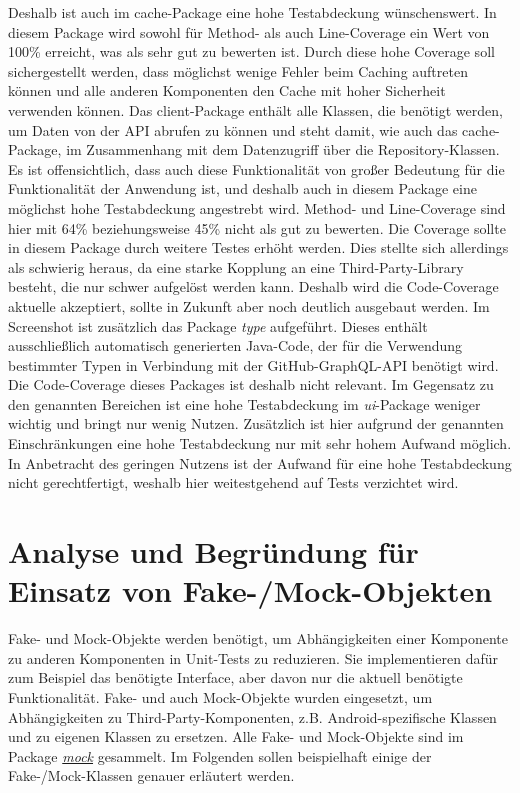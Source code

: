 Deshalb ist  auch im cache-Package eine hohe Testabdeckung wünschenswert.
In diesem Package wird sowohl für Method- als auch Line-Coverage ein Wert von 100\% erreicht, was als sehr gut zu bewerten ist.
Durch diese hohe Coverage soll sichergestellt werden, dass möglichst wenige Fehler beim Caching auftreten können und alle anderen Komponenten den Cache mit hoher Sicherheit verwenden können.
\newline
\newline
Das client-Package enthält alle Klassen, die benötigt werden, um Daten von der API abrufen zu können und steht damit, wie auch das cache-Package, im Zusammenhang mit dem Datenzugriff über die Repository-Klassen.
Es ist offensichtlich, dass auch diese Funktionalität von großer Bedeutung für die Funktionalität der Anwendung ist, und deshalb auch in diesem Package eine möglichst hohe Testabdeckung angestrebt wird.
Method- und Line-Coverage sind hier mit 64\% beziehungsweise 45\% nicht als gut zu bewerten.
Die Coverage sollte in diesem Package durch weitere Testes erhöht werden.
Dies stellte sich allerdings als schwierig heraus, da eine starke Kopplung an eine Third-Party-Library besteht, die nur schwer aufgelöst werden kann.
Deshalb wird die Code-Coverage aktuelle akzeptiert, sollte in Zukunft aber noch deutlich ausgebaut werden.
\newline
\newline
Im Screenshot ist zusätzlich das Package \textit{type} aufgeführt.
Dieses enthält ausschließlich automatisch generierten Java-Code, der für die Verwendung bestimmter Typen in Verbindung mit der GitHub-GraphQL-API benötigt wird.
Die Code-Coverage dieses Packages ist deshalb nicht relevant.
\newline
\newline
Im Gegensatz zu den genannten Bereichen ist eine hohe Testabdeckung im \textit{ui}-Package weniger wichtig und bringt nur wenig Nutzen. 
Zusätzlich ist hier aufgrund der genannten Einschränkungen eine hohe Testabdeckung nur mit sehr hohem Aufwand möglich.
In Anbetracht des geringen Nutzens ist der Aufwand für eine hohe Testabdeckung nicht gerechtfertigt, weshalb hier weitestgehend auf Tests verzichtet wird.

\newpage
\section{Analyse und Begründung für Einsatz von Fake-/Mock-Objekten}

Fake- und Mock-Objekte werden benötigt, um Abhängigkeiten einer Komponente zu anderen Komponenten in Unit-Tests zu reduzieren.
Sie implementieren dafür zum Beispiel das benötigte Interface, aber davon nur die aktuell benötigte Funktionalität.
Fake- und auch Mock-Objekte wurden eingesetzt, um Abhängigkeiten zu Third-Party-Komponenten, z.B. Android-spezifische Klassen und zu eigenen Klassen zu ersetzen.
Alle Fake- und Mock-Objekte sind im Package \textit{\href{https://github.com/lukaspanni/OpenSourceStats/tree/main/app/src/test/java/de/lukaspanni/opensourcestats/mock}{mock}} gesammelt.
\newline
Im Folgenden sollen beispielhaft einige der Fake-/Mock-Klassen genauer erläutert werden.
\newpage
